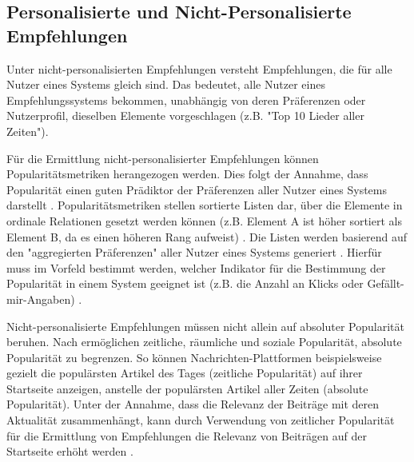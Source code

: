 \subsection{Personalisierte und Nicht-Personalisierte Empfehlungen}
Unter nicht-personalisierten Empfehlungen versteht \textcite[S. 400]{unternährer:article} Empfehlungen, die für alle Nutzer eines Systems gleich sind.
Das bedeutet, alle Nutzer eines Empfehlungssystems bekommen, unabhängig von deren Präferenzen oder Nutzerprofil, dieselben Elemente vorgeschlagen (z.B. "Top 10 Lieder aller Zeiten").

Für die Ermittlung nicht-personalisierter Empfehlungen können Popularitätsmetriken herangezogen werden.
Dies folgt der Annahme, dass Popularität einen guten Prädiktor der Präferenzen aller Nutzer eines Systems darstellt \cite[S. 406]{unternährer:article}.
Popularitätsmetriken stellen sortierte Listen dar, über die Elemente in ordinale Relationen gesetzt werden können (z.B. Element A ist höher sortiert als Element B, da es einen höheren Rang aufweist) \cite[S. 404ff.]{unternährer:article}.
Die Listen werden basierend auf den "aggregierten Präferenzen" aller Nutzer eines Systems generiert \cite[S. 404]{unternährer:article}.
Hierfür muss im Vorfeld bestimmt werden, welcher Indikator für die Bestimmung der Popularität in einem System geeignet ist (z.B. die Anzahl an Klicks oder Gefällt-mir-Angaben) \cite[S. 406]{unternährer:article}.

Nicht-personalisierte Empfehlungen müssen nicht allein auf absoluter Popularität beruhen.
Nach \textcite[S. 405]{unternährer:article} ermöglichen zeitliche, räumliche und soziale Popularität, absolute Popularität zu begrenzen.
So können Nachrichten-Plattformen beispielsweise gezielt die populärsten Artikel des Tages (zeitliche Popularität) auf ihrer Startseite anzeigen, anstelle der populärsten Artikel aller Zeiten (absolute Popularität).
Unter der Annahme, dass die Relevanz der Beiträge mit deren Aktualität zusammenhängt, kann durch Verwendung von zeitlicher Popularität für die Ermittlung von Empfehlungen die Relevanz von Beiträgen auf der Startseite erhöht werden \cite[S. 405]{unternährer:article}.

